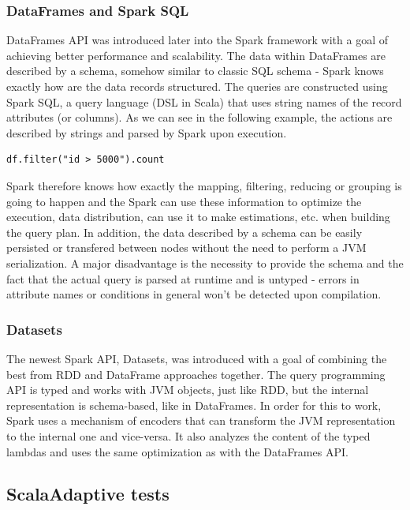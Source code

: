 \subsubsection{DataFrames and Spark SQL}

DataFrames API was introduced later into the Spark framework with a goal of achieving better performance and scalability. The data within DataFrames are described by a schema, somehow similar to classic SQL schema - Spark knows exactly how are the data records structured. The queries are constructed using Spark SQL, a query language (DSL in Scala) that uses string names of the record attributes (or columns). As we can see in the following example, the actions are described by strings and parsed by Spark upon execution.

\lstset{style=Scala}
\begin{lstlisting}
df.filter("id > 5000").count
\end{lstlisting}

Spark therefore knows how exactly the mapping, filtering, reducing or grouping is going to happen and the Spark can use these information to optimize the execution, data distribution, can use it to make estimations, etc. when building the query plan. In addition, the data described by a schema can be easily persisted or transfered between nodes without the need to perform a JVM serialization. A major disadvantage is the necessity to provide the schema and the fact that the actual query is parsed at runtime and is untyped - errors in attribute names or conditions in general won't be detected upon compilation.

\subsubsection{Datasets}

The newest Spark API, Datasets, was introduced with a goal of combining the best from RDD and DataFrame approaches together. The query programming API is typed and works with JVM objects, just like RDD, but the internal representation is schema-based, like in DataFrames. In order for this to work, Spark uses a mechanism of encoders that can transform the JVM representation to the internal one and vice-versa. It also analyzes the content of the typed lambdas and uses the same optimization as with the DataFrames API.

\subsection{ScalaAdaptive tests}

